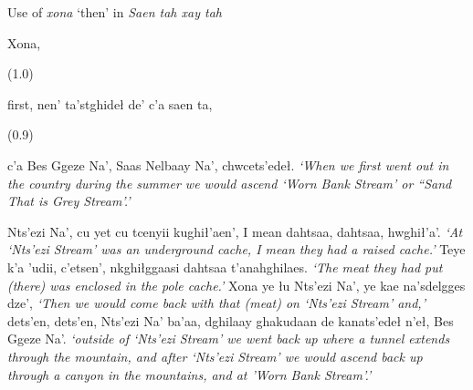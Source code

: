 \begin{exe}
\ex Use of \textit{xona} ‘then’ in \textit{Saen tah xay tah}\label{berez-ex10}
\begin{xlistn}
 	Xona,
\sn \begin{flushright}(1.0)\end{flushright}
 			first,
 			nen’ ta’stghideł de’ c’a saen ta,
\sn \begin{flushright}(0.9)\end{flushright}
 			c’a Bes Ggeze Na’,
 			Saas Nelbaay Na’,
   			chwcets’edeł.
\glt \textit{‘When we first went out in the country during the summer we would ascend ‘Worn Bank Stream’ or “Sand That is Grey Stream’.’}


 	 		Nts’ezi Na’,
 	 		cu yet cu tcenyii kughił’aen’,
 	 		I mean dahtsaa,
 	 		dahtsaa,
   				hwghił’a’.
\glt \textit{‘At ‘Nts'ezi Stream’ was an underground cache, I mean they had a raised cache.’}
 	 		Teye k’a ’udii,
 	 		c’etsen’,
   	 		nkghiłggaasi dahtsaa t’anahghilaes.
\glt \textit{‘The meat they had put (there) was enclosed in the pole cache.’}
 	 		Xona ye łu Nts’ezi Na’,
   	 		ye kae na'sdelgges dze’,
\glt \textit{‘Then we would come back with that (meat) on ‘Nts'ezi Stream’ and,’}
 				dets’en,
 	 		dets’en,
 	 		Nts’ezi Na’ ba’aa,
 	 		dghilaay ghakudaan de kanats’edeł n’eł,
   	 		Bes Ggeze Na’.
\glt \textit{‘outside of ‘Nts’ezi Stream’ we went back up where a tunnel extends through the mountain, and after ‘Nts'ezi Stream’ we would ascend back up through a canyon in the mountains, and at 'Worn Bank Stream’.’}



\end{xlistn}
\end{exe}
